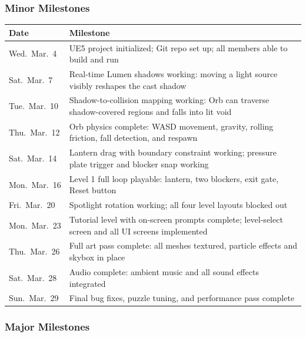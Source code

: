 \documentclass[11pt, letterpaper]{article}
\begin{document}
        \subsubsection{Minor Milestones}

        \begin{center}
        \begin{tabular}{p{2.4cm} p{9.5cm}}
        \hline
        \textbf{Date} & \textbf{Milestone} \\
        \hline
        Wed.\ Mar.\ 4  & UE5 project initialized; Git repo set up; all members able to build and run \\
        Sat.\ Mar.\ 7  & Real-time Lumen shadows working: moving a light source visibly reshapes the cast shadow \\
        Tue.\ Mar.\ 10 & Shadow-to-collision mapping working: Orb can traverse shadow-covered regions and falls into lit void \\
        Thu.\ Mar.\ 12 & Orb physics complete: WASD movement, gravity, rolling friction, fall detection, and respawn \\
        Sat.\ Mar.\ 14 & Lantern drag with boundary constraint working; pressure plate trigger and blocker snap working \\
        Mon.\ Mar.\ 16 & Level 1 full loop playable: lantern, two blockers, exit gate, Reset button \\
        Fri.\ Mar.\ 20 & Spotlight rotation working; all four level layouts blocked out \\
        Mon.\ Mar.\ 23 & Tutorial level with on-screen prompts complete; level-select screen and all UI screens implemented \\
        Thu.\ Mar.\ 26 & Full art pass complete: all meshes textured, particle effects and skybox in place \\
        Sat.\ Mar.\ 28 & Audio complete: ambient music and all sound effects integrated \\
        Sun.\ Mar.\ 29 & Final bug fixes, puzzle tuning, and performance pass complete \\
        \hline
        \end{tabular}
        \end{center}

        \subsubsection{Major Milestones}
\end{document}
